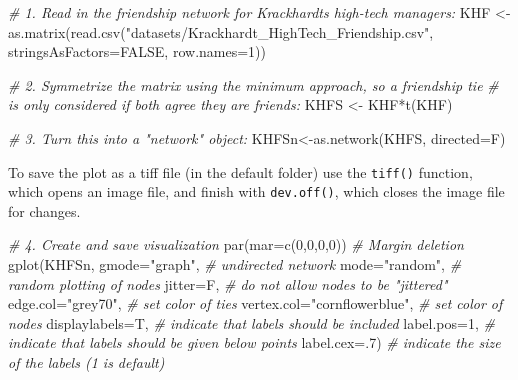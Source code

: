 \documentclass[
  notitlepage,
  onecolumn,
  openany]{book}
\newenvironment{Shaded}{\begin{snugshade}}{\end{snugshade}}
\newcommand{\AttributeTok}[1]{\textcolor[rgb]{0.77,0.63,0.00}{#1}}
\newcommand{\CommentTok}[1]{\textcolor[rgb]{0.56,0.35,0.01}{\textit{#1}}}
\newcommand{\ConstantTok}[1]{\textcolor[rgb]{0.00,0.00,0.00}{#1}}
\newcommand{\DecValTok}[1]{\textcolor[rgb]{0.00,0.00,0.81}{#1}}
\newcommand{\FunctionTok}[1]{\textcolor[rgb]{0.00,0.00,0.00}{#1}}
\newcommand{\NormalTok}[1]{#1}
\newcommand{\OtherTok}[1]{\textcolor[rgb]{0.56,0.35,0.01}{#1}}
\newcommand{\SpecialCharTok}[1]{\textcolor[rgb]{0.00,0.00,0.00}{#1}}
\newcommand{\StringTok}[1]{\textcolor[rgb]{0.31,0.60,0.02}{#1}}
\begin{document}
\begin{Shaded}
\begin{Highlighting}[]
\CommentTok{\# 1. Read in the friendship network for Krackhardt\textquotesingle{}s high{-}tech managers:}
\NormalTok{KHF }\OtherTok{\textless{}{-}} \FunctionTok{as.matrix}\NormalTok{(}\FunctionTok{read.csv}\NormalTok{(}\StringTok{"datasets/Krackhardt\_HighTech\_Friendship.csv"}\NormalTok{,}
                          \AttributeTok{stringsAsFactors=}\ConstantTok{FALSE}\NormalTok{, }\AttributeTok{row.names=}\DecValTok{1}\NormalTok{))}


\CommentTok{\# 2. Symmetrize the matrix using the minimum approach, so a friendship tie}
\CommentTok{\# is only considered if both agree they are friends:}
\NormalTok{KHFS }\OtherTok{\textless{}{-}}\NormalTok{ KHF}\SpecialCharTok{*}\FunctionTok{t}\NormalTok{(KHF)}

\CommentTok{\# 3. Turn this into a "network" object:}
\NormalTok{KHFSn}\OtherTok{\textless{}{-}}\FunctionTok{as.network}\NormalTok{(KHFS, }\AttributeTok{directed=}\NormalTok{F)}
\end{Highlighting}
\end{Shaded}

To save the plot as a tiff file (in the default folder) use the \texttt{tiff()} function, which opens an image file,
and finish with \texttt{dev.off()}, which closes the image file for changes.

\begin{Shaded}
\begin{Highlighting}[]
\CommentTok{\# 4. Create and save visualization}
\FunctionTok{par}\NormalTok{(}\AttributeTok{mar=}\FunctionTok{c}\NormalTok{(}\DecValTok{0}\NormalTok{,}\DecValTok{0}\NormalTok{,}\DecValTok{0}\NormalTok{,}\DecValTok{0}\NormalTok{)) }\CommentTok{\# Margin deletion}
\FunctionTok{gplot}\NormalTok{(KHFSn,}
      \AttributeTok{gmode=}\StringTok{"graph"}\NormalTok{,      }\CommentTok{\# undirected network}
      \AttributeTok{mode=}\StringTok{"random"}\NormalTok{,      }\CommentTok{\# random plotting of nodes}
      \AttributeTok{jitter=}\NormalTok{F,           }\CommentTok{\# do not allow nodes to be "jittered"}
      \AttributeTok{edge.col=}\StringTok{"grey70"}\NormalTok{,  }\CommentTok{\# set color of ties}
      \AttributeTok{vertex.col=}\StringTok{"cornflowerblue"}\NormalTok{,   }\CommentTok{\# set color of nodes}
      \AttributeTok{displaylabels=}\NormalTok{T,    }\CommentTok{\# indicate that labels should be included}
      \AttributeTok{label.pos=}\DecValTok{1}\NormalTok{,        }\CommentTok{\# indicate that labels should be given below points}
      \AttributeTok{label.cex=}\NormalTok{.}\DecValTok{7}\NormalTok{)       }\CommentTok{\# indicate the size of the labels (1 is default)}
\end{Highlighting}
\end{Shaded}
\end{document}
